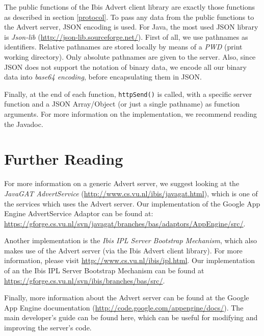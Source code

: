 \documentclass[a4paper,10pt]{article}
\begin{document}
The public functions of the Ibis Advert client library are exactly those
functions as described in section \ref{protocol}. To pass any data from the
public functions to the Advert server, JSON encoding is used. For Java, the most
used JSON library is \emph{Json-lib} (\url{http://json-lib.sourceforge.net/}).
First of all, we use pathnames as identifiers. Relative pathnames are stored
locally by means of a \emph{PWD} (print working directory). Only absolute
pathnames are given to the server. Also, since JSON does not support the notation
of binary data, we encode all our binary data into \emph{base64 encoding}, before
encapsulating them in JSON.

Finally, at the end of each function, \texttt{httpSend()} is called, with a
specific server function and a JSON Array/Object (or just a single pathname) as
function arguments. For more information on the implementation, we recommend
reading the Javadoc.
 
\section{Further Reading}
\label{further}
For more information on a generic Advert server, we suggest looking at the
\emph{JavaGAT AdvertService} (\url{http://www.cs.vu.nl/ibis/javagat.html}),
which is one of the services which uses the Advert server. Our implementation
of the Google App Engine AdvertService Adaptor can be found at: 
\url{https://gforge.cs.vu.nl/svn/javagat/branches/bas/adaptors/AppEngine/src/}. 

Another implementation is the \emph{Ibis IPL Server Bootstrap Mechanism}, which
also makes use of the Advert server (via the Ibis Advert client library). For more
information, please visit \url{http://www.cs.vu.nl/ibis/ipl.html}. Our
implementation of an the Ibis IPL Server Bootstrap Mechanism can be found at 
\url{https://gforge.cs.vu.nl/svn/ibis/branches/bas/src/}. 

Finally, more information about the Advert server can be found at the Google
App Engine documentation (\url{http://code.google.com/appengine/docs/}). The
main developer's guide can be found here, which can be useful for modifying and
improving the server's code.
\end{document}
